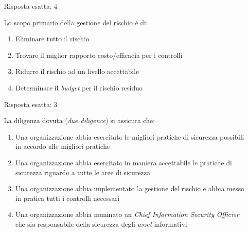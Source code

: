 \begin{Answer} [
  ref={gestRisk7},
  number={7}
  ]

  \Question Risposta esatta: 4

\end{Answer}



\begin{Exercise} [
  title={Quiz},
  label={gestRisk8}
  ]

  \Question Lo scopo primario della gestione del rischio \`e di:
\begin{enumerate}
 \item Eliminare tutto il rischio
 \item Trovare il miglior rapporto costo/efficacia per i controlli
 \item Ridurre il rischio ad un livello accettabile
 \item Determinare il \textit{budget} per il rischio residuo
\end{enumerate}

\end{Exercise}


\begin{Answer} [
  ref={gestRisk8},
  number={8}
  ]

  \Question Risposta esatta: 3

\end{Answer}



\begin{Exercise} [
  title={Quiz},
  label={gestRisk9}
  ]

  \Question La diligenza dovuta (\textit{due diligence}) si assicura che:
\begin{enumerate}
 \item Una organizzazione abbia esercitato le migliori pratiche di sicurezza
possibili in accordo alle migliori pratiche
 \item Una organizzazione abbia esercitato in maniera accettabile le pratiche
di sicurezza riguardo a tutte le aree di sicurezza
 \item Una organizzazione abbia implementato la gestione del rischio e abbia
messo in pratica tutti i controlli necessari
 \item Una organizzazione abbia nominato un \textit{Chief Information Security
Officier} che sia responsabile della sicurezza degli \textit{asset} informativi
\end{enumerate}

\end{Exercise}


